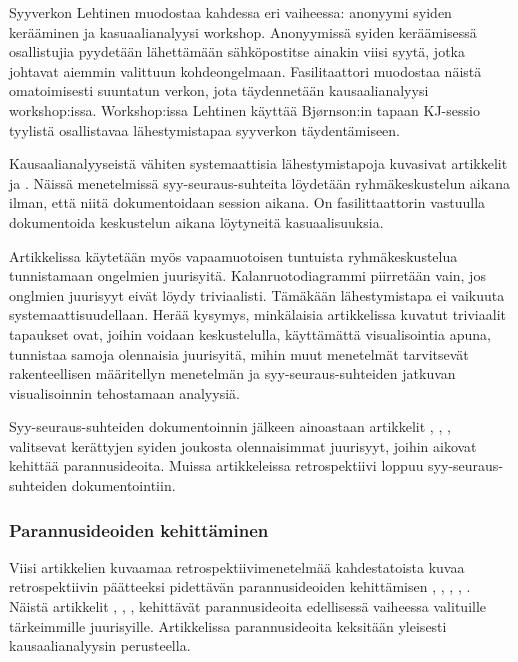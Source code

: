 Syyverkon Lehtinen muodostaa kahdessa eri vaiheessa: anonyymi syiden kerääminen ja kasuaalianalyysi workshop. Anonyymissä syiden keräämisessä osallistujia pyydetään lähettämään sähköpostitse ainakin viisi syytä, jotka johtavat aiemmin valittuun kohdeongelmaan. Fasilitaattori muodostaa näistä omatoimisesti suuntatun verkon, jota täydennetään kausaalianalyysi workshop:issa. Workshop:issa Lehtinen käyttää Bj{\o}rnson:in tapaan KJ-sessio tyylistä osallistavaa lähestymistapaa syyverkon täydentämiseen. \citep{Lehtinen2011}

Kausaalianalyyseistä vähiten systemaattisia lähestymistapoja kuvasivat artikkelit \citep{karlsson2006case} ja \citep{staalhane2003post}. Näissä menetelmissä syy-seuraus-suhteita löydetään ryhmäkeskustelun aikana ilman, että niitä dokumentoidaan session aikana. On fasilittaattorin vastuulla dokumentoida keskustelun aikana löytyneitä kasuaalisuuksia.

Artikkelissa \citep{card1998learning} käytetään myös vapaamuotoisen tuntuista ryhmäkeskustelua tunnistamaan ongelmien juurisyitä. Kalanruotodiagrammi piirretään vain, jos onglmien juurisyyt eivät löydy triviaalisti. Tämäkään lähestymistapa ei vaikuuta systemaattisuudellaan. Herää kysymys, minkälaisia artikkelissa kuvatut triviaalit tapaukset ovat, joihin voidaan keskustelulla, käyttämättä visualisointia apuna, tunnistaa samoja olennaisia juurisyitä, mihin muut menetelmät tarvitsevät rakenteellisen määritellyn menetelmän ja syy-seuraus-suhteiden jatkuvan visualisoinnin tehostamaan analyysiä.

Syy-seuraus-suhteiden dokumentoinnin jälkeen ainoastaan artikkelit \citep{card1998learning}, \citep{staalhane2004root}, \citep{karlsson2006case}, \citep{Lehtinen2011} valitsevat kerättyjen syiden joukosta olennaisimmat juurisyyt, joihin aikovat kehittää parannusideoita. Muissa artikkeleissa retrospektiivi loppuu syy-seuraus-suhteiden dokumentointiin.

\subsubsection{Parannusideoiden kehittäminen}

Viisi artikkelien kuvaamaa retrospektiivimenetelmää kahdestatoista kuvaa retrospektiivin päätteeksi pidettävän parannusideoiden kehittämisen \citep{card1998learning}, \citep{staalhane2003post}, \citep{staalhane2004root}, \citep{karlsson2006case}, \citep{Lehtinen2011}. Näistä artikkelit \citep{card1998learning}, \citep{staalhane2004root}, \citep{karlsson2006case}, \citep{Lehtinen2011} kehittävät parannusideoita edellisessä vaiheessa valituille tärkeimmille juurisyille. Artikkelissa \citep{staalhane2003post} parannusideoita keksitään yleisesti kausaalianalyysin perusteella.

